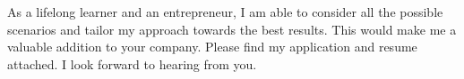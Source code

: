\documentclass[11pt,a4paper,roman]{moderncv}
\begin{document}
As a lifelong learner and an entrepreneur, I am able to consider all the possible scenarios and tailor my approach towards the best results. This would make me a valuable addition to your company. Please find my application and resume attached. 
I look forward to hearing from you.

\vspace{0.5cm}


\makeletterclosing
\end{document}
